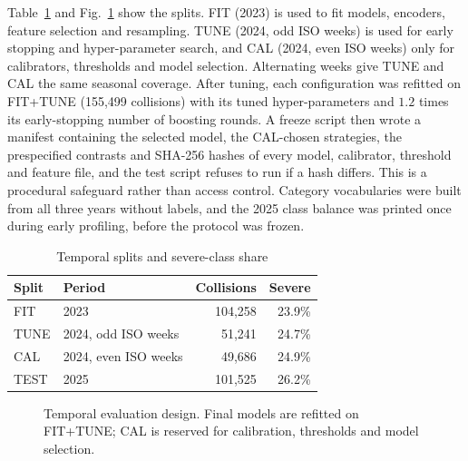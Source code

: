 \documentclass[conference,letterpaper]{IEEEtran}
\begin{document}
Table~\ref{tab:splits} and Fig.~\ref{fig:design} show the splits. FIT (2023) is used to fit models, encoders, feature selection and resampling. TUNE (2024, odd ISO weeks) is used for early stopping and hyper-parameter search, and CAL (2024, even ISO weeks) only for calibrators, thresholds and model selection. Alternating weeks give TUNE and CAL the same seasonal coverage. After tuning, each configuration was refitted on FIT+TUNE (155,499 collisions) with its tuned hyper-parameters and $1.2$ times its early-stopping number of boosting rounds. A freeze script then wrote a manifest containing the selected model, the CAL-chosen strategies, the prespecified contrasts and SHA-256 hashes of every model, calibrator, threshold and feature file, and the test script refuses to run if a hash differs. This is a procedural safeguard rather than access control. Category vocabularies were built from all three years without labels, and the 2025 class balance was printed once during early profiling, before the protocol was frozen.

\begin{table}[t]
\centering
\caption{Temporal splits and severe-class share}
\label{tab:splits}
\setlength{\tabcolsep}{4pt}
\begin{tabular}{@{}llrr@{}}
\toprule
Split & Period & Collisions & Severe \\
\midrule
FIT & 2023 & 104,258 & 23.9\% \\
TUNE & 2024, odd ISO weeks & 51,241 & 24.7\% \\
CAL & 2024, even ISO weeks & 49,686 & 24.9\% \\
TEST & 2025 & 101,525 & 26.2\% \\
\bottomrule
\end{tabular}
\end{table}

\begin{figure}[t]
\centering
{}
\caption{Temporal evaluation design. Final models are refitted on FIT+TUNE; CAL is reserved for calibration, thresholds and model selection.}
\label{fig:design}
\end{figure}
\end{document}
